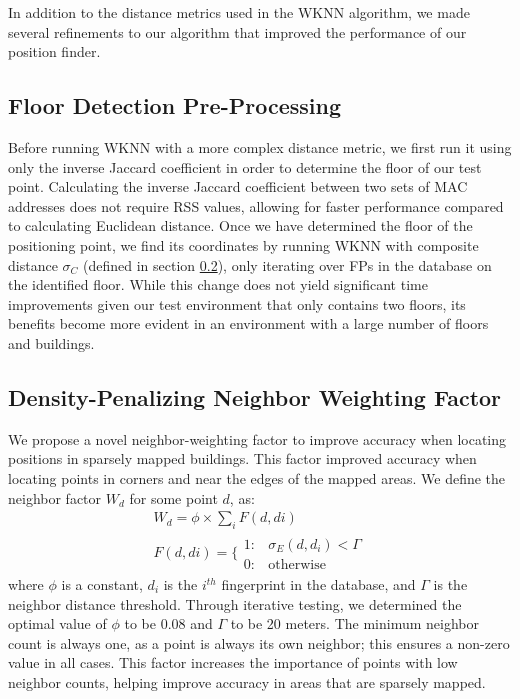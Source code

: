 \documentclass[conference]{IEEEtran}
\begin{document}
In addition to the distance metrics used in the WKNN algorithm, we made several refinements to our algorithm that improved the performance of our position finder. 

\subsection{Floor Detection Pre-Processing}\label{subsec:floor_preprocessing}
\indent Before running WKNN with a more complex distance metric, we first run it using only the inverse Jaccard coefficient in order to determine the floor of our test point. Calculating the inverse Jaccard coefficient between two sets of MAC addresses does not require RSS values, allowing for faster performance compared to calculating Euclidean distance. Once we have determined the floor of the positioning point, we find its coordinates by running WKNN with composite distance $\sigma_C$ (defined in section \ref{subsec:density_penalizing_neighbor_weighting}), only iterating over FPs in the database on the identified floor. While this change does not yield significant time improvements given our test environment that only contains two floors, its benefits become more evident in an environment with a large number of floors and buildings.

\subsection{Density-Penalizing Neighbor Weighting Factor}\label{subsec:density_penalizing_neighbor_weighting}
\indent We propose a novel neighbor-weighting factor to improve accuracy when locating positions in sparsely mapped buildings. This factor improved accuracy when locating points in corners and near the edges of the mapped areas. We define the neighbor factor $W_d$ for some point $d$, as:
\begin{equation}
\label{eq:density}
\begin{split}
W_d=\phi\times\sum\limits_{i}F(d,di)\\
F(d,di)=\{\begin{array}{lr}
       1: &  \sigma_E(d, d_i) < \Gamma \\
       0: &  \text{otherwise}
\end{array}
\end{split}
\end{equation}
where $\phi$ is a constant, $d_i$ is the $i^{th}$ fingerprint in the database, and $\Gamma$ is the neighbor distance threshold. Through iterative testing, we determined the optimal value of $\phi$ to be 0.08 and $\Gamma$ to be 20 meters. The minimum neighbor count is always one, as a point is always its own neighbor; this ensures a non-zero value in all cases. This factor increases the importance of points with low neighbor counts, helping improve accuracy in areas that are sparsely mapped. 
\end{document}
